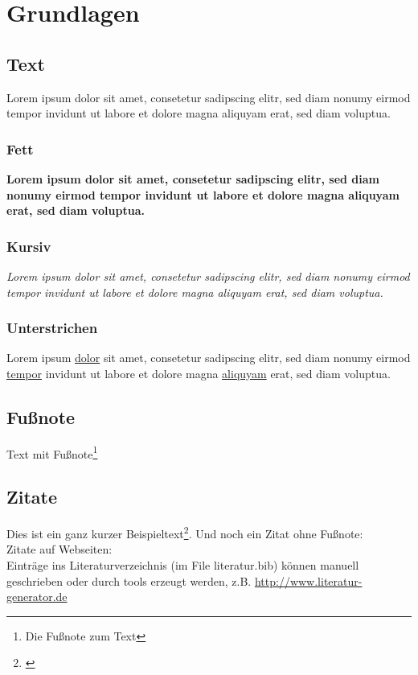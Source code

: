 \chapter{Grundlagen}
\section{Text}
Lorem ipsum dolor sit amet, consetetur sadipscing elitr, sed diam nonumy eirmod tempor invidunt ut labore et dolore magna aliquyam erat, sed diam voluptua.

\subsection{Fett}
\textbf{Lorem ipsum dolor sit amet, consetetur sadipscing elitr, sed diam nonumy eirmod tempor invidunt ut labore et dolore magna aliquyam erat, sed diam voluptua.}

\subsection{Kursiv}
\textit{Lorem ipsum dolor sit amet, consetetur sadipscing elitr, sed diam nonumy eirmod tempor invidunt ut labore et dolore magna aliquyam erat, sed diam voluptua.}

\subsection{Unterstrichen}
Lorem ipsum \underline{dolor} sit amet, consetetur sadipscing elitr, sed diam nonumy eirmod \underline{tempor} invidunt ut labore et dolore magna \underline{aliquyam} erat, sed diam voluptua.

\section{Fußnote}

Text mit Fußnote\footnote{Die Fußnote zum Text}

\section{Zitate}

Dies ist ein ganz kurzer Beispieltext\footnote{\cite{Richter2016}}. Und noch ein Zitat ohne Fußnote:~\cite{Jacobsen2017}
\\
Zitate auf Webseiten:~\cite{PlutoRed}
\\
Einträge ins Literaturverzeichnis (im File literatur.bib) können manuell geschrieben\citationneeded{} oder durch tools erzeugt werden, z.B. \url{http://www.literatur-generator.de}

